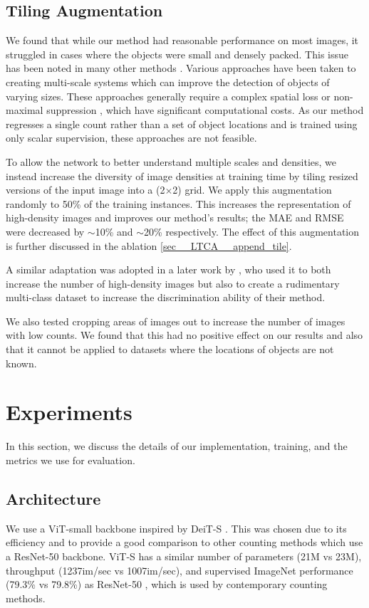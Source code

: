 \documentclass[../thesis.tex]{subfiles}
\begin{document}
\subsection{Tiling Augmentation}
We found that while our method had reasonable performance on most images, it struggled in cases where the objects were small and densely packed. This issue has been noted in many other methods \cite{ranjan2021Famnet, liu2022countr, ranjan2022exemplar}.
Various approaches have been taken to creating multi-scale systems which can improve the detection of objects of varying sizes. 
These approaches generally require a complex spatial loss \cite{redmon2016YOLO} or non-maximal suppression \cite{ren2015fasterrcnn}, which have significant computational costs.
As our method regresses a single count rather than a set of object locations and is trained using only scalar supervision, these approaches are not feasible.

To allow the network to better understand multiple scales and densities, we instead increase the diversity of image densities at training time by tiling resized versions of the input image into a (2$\times$2) grid.
We apply this augmentation randomly to 50\% of the training instances.  
This increases the representation of high-density images and improves our method's results; the MAE and RMSE were decreased by $\sim$10\% and $\sim$20\% respectively. The effect of this augmentation is further discussed in the ablation  \cref{sec__LTCA__append_tile}.

A similar adaptation was adopted in a later work by \citet{liu2022countr}, who used it to both increase the number of high-density images but also to create a rudimentary multi-class dataset to increase the discrimination ability of their method.

We also tested cropping areas of images out to increase the number of images with low counts. 
We found that this had no positive effect on our results and also that it cannot be applied to datasets where the locations of objects are not known.


\section{Experiments}
\label{LTCA__sec__experiments}
In this section, we discuss the details of our implementation, training, and the metrics we use for evaluation.
\subsection{Architecture}
\label{LTCA__sec__experiments_implementationdetails}
We use a ViT-small backbone inspired by DeiT-S \cite{touvron2021training}. This was chosen due to its efficiency and to provide a good comparison to other counting methods
which use a ResNet-50 backbone. 
ViT-S has a similar number of parameters (21M vs 23M), throughput (1237im/sec vs 1007im/sec), and supervised ImageNet performance (79.3\% vs 79.8\%) as ResNet-50 \cite{touvron2021training}, which is used by contemporary counting methods.
\end{document}
